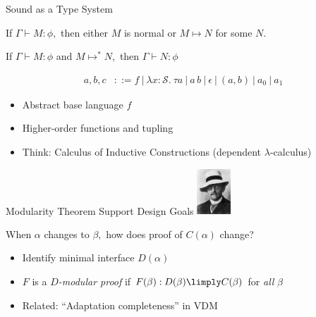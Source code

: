 \documentclass[slidestop,aspectratio=169]{beamer}
\newcommand{\allstate}{\mathcal{S}}
\newcommand{\fint}[2]{#2\lenvelope#1\renvelope}
\newcommand{\om}{\omega}
\newcommand{\stepsto}{\allowbreak\mapsto\allowbreak}
\newcommand{\bebecomes}{\mathrel{::=}}
\newcommand{\alternative}{~|~}
\newcommand{\stt}{\textsf{early\_win}}
\newcommand{\rzFst}[1]{#1_0}
\newcommand{\rzSnd}[1]{#1_1}
\newcommand{\rzApp}[2]{#1\,#2}
\renewcommand{\aa}{a}
\newcommand{\ab}{b}
\newcommand{\ac}{c}
\newcommand{\rzNil}{\epsilon}
\newcommand{\rzCons}[2]{(#1,#2)}
\newcommand{\rzBLam}[2]{\lambda #1:\allstate.~#2}
\newcommand{\fintR}[1]{\fint{#1}{}} %
\newcommand*{\strategyforR}[2][]{{#2}\Langle{#1}\Rangle}
\newcommand{\cintR}[1]{\fintR{\bigwedge #1}}
\newcommand{\proves}[3]{#1\allowbreak\vdash #2 \allowbreak \mathop{:} #3}
\newcommand{\G}{\Gamma}
\theoremstyle{plain}
\theoremstyle{definition}
\theoremstyle{remark}
\newcommand{\logician}[1][1in]{\includegraphics[width=#1]{img/hilbert.png}}
\begin{document}
\begin{frame}[t]{Sound as a Type System}
\begin{lemma}[Progress]
If $\proves{\Gamma}{M}{\phi},$ then either $M$ is normal or $M \stepsto N$ for some $N$.
\end{lemma}
\begin{lemma}[Preservation]
If $\proves{\Gamma}{M}{\phi}$ and $M \stepsto^* N,$ then $\proves{\Gamma}{N}{\phi}$
\end{lemma}
\end{frame}




  \begin{align*}
\aa,\ab,\ac
&\bebecomes f  \alternative \rzBLam{x}{\tau}{\aa} \alternative \rzApp{\aa}{\ab} \alternative  \rzNil \alternative \rzCons{\aa}{\ab}  \alternative \rzFst{\aa} \alternative \rzSnd{\aa}
  \end{align*}
\begin{itemize}
\item Abstract base language $f$
\item Higher-order functions and tupling
\item Think: Calculus of Inductive Constructions (dependent $\lambda$-calculus)
\end{itemize}



\begin{frame}[t]{Modularity Theorem Support Design Goals}
\logician[0.5in]
\begin{center}
When $\alpha$ changes to $\beta,$ how does proof of $C(\alpha)$ change?
\begin{itemize}
\item Identify minimal interface $D(\alpha)$
\item $F$ is a $D$\emph{-modular proof} if $F(\beta): D(\beta) \limply C(\beta)$ for \emph{all} $\beta$
\item Related: ``Adaptation completeness'' in VDM
\end{itemize}
\end{center}
\end{frame}
\end{document}
